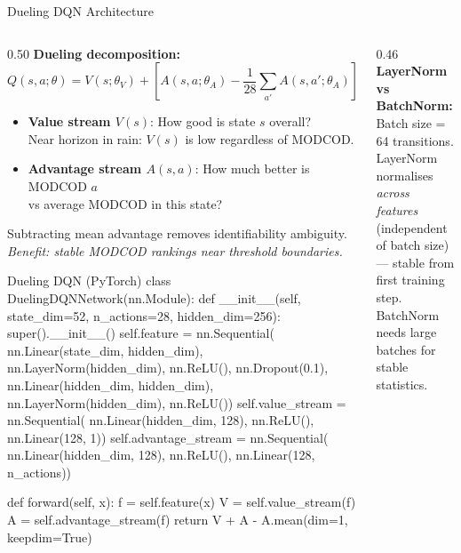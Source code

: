\documentclass[aspectratio=169,10pt]{beamer}
\begin{document}
\begin{frame}[fragile,shrink=10]{Dueling DQN Architecture}
  \begin{columns}[T]
    \begin{column}{0.50\textwidth}
      \textbf{Dueling decomposition:}
      \[Q(s,a;\theta) = V(s;\theta_V) + \left[A(s,a;\theta_A) - \frac{1}{28}\sum_{a'}A(s,a';\theta_A)\right]\]
      \begin{itemize}\scriptsize
        \item \textbf{Value stream $V(s)$}: How good is state $s$ overall?\\
              Near horizon in rain: $V(s)$ is low regardless of MODCOD.
        \item \textbf{Advantage stream $A(s,a)$}: How much better is MODCOD $a$\\
              vs average MODCOD in this state?
      \end{itemize}
      Subtracting mean advantage removes identifiability ambiguity.\\
      \textit{Benefit: stable MODCOD rankings near threshold boundaries.}

\begin{codeblock}{Dueling DQN (PyTorch)}
class DuelingDQNNetwork(nn.Module):
  def __init__(self, state_dim=52, n_actions=28,
               hidden_dim=256):
    super().__init__()
    self.feature = nn.Sequential(
      nn.Linear(state_dim, hidden_dim),
      nn.LayerNorm(hidden_dim), nn.ReLU(),
      nn.Dropout(0.1),
      nn.Linear(hidden_dim, hidden_dim),
      nn.LayerNorm(hidden_dim), nn.ReLU())
    self.value_stream = nn.Sequential(
      nn.Linear(hidden_dim, 128), nn.ReLU(),
      nn.Linear(128, 1))
    self.advantage_stream = nn.Sequential(
      nn.Linear(hidden_dim, 128), nn.ReLU(),
      nn.Linear(128, n_actions))

  def forward(self, x):
    f = self.feature(x)
    V = self.value_stream(f)
    A = self.advantage_stream(f)
    return V + A - A.mean(dim=1, keepdim=True)
\end{codeblock}
    \end{column}
    \begin{column}{0.46\textwidth}
      \textbf{LayerNorm vs BatchNorm:}\\
      \scriptsize Batch size = 64 transitions. LayerNorm normalises \emph{across features}
      (independent of batch size) — stable from first training step.\\
      BatchNorm needs large batches for stable statistics.


\end{column}
\end{columns}
\end{frame}
\end{document}
